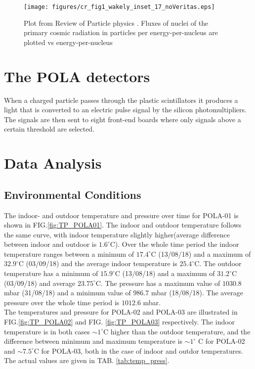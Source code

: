\documentclass[prX, twocolumn, a4paper]{revtex4}
\begin{document}
\begin{figure}
    \centering
    \texttt{[image: figures/cr\_fig1\_wakely\_inset\_17\_noVeritas.eps]}
    \caption{Plot from Review of Particle physics \cite{PhysRevD.98.030001}. Fluxes of nuclei of the primary cosmic radiation in particles per energy-per-nucleus are plotted vs energy-per-nucleus}
    \label{fig:cosmic_ray_flux}
\end{figure}

\section{The POLA detectors}

When a charged particle passes through the plastic scintillators it produces a light that is converted to an electric pulse signal by the silicon photomultipliers. The signals are then sent to eight front-end boards where only signals above a certain threshold are selected.

\section{Data Analysis}
\subsection{Environmental Conditions}

The indoor- and outdoor temperature and pressure over time for POLA-01 is shown in FIG.\ref{fig:TP_POLA01}. The indoor and outdoor temperature follows the same curve, with indoor temperature slightly higher(average difference between indoor and outdoor is $1.6^\circ$C). Over the whole time period the indoor temperature ranges between a minimum of $17.4^\circ$C (13/08/18) and a maximum of $32.9^\circ$C (03/09/18) and the average indoor temperature is $25.4^\circ$C. The outdoor temperature has a minimum of $15.9^\circ$C (13/08/18) and a maximum of $31.2^\circ$C (03/09/18) and average $23.75^\circ$C. The pressure has a maximum value of $1030.8$ mbar (31/08/18) and a minimum value of $986.7$ mbar (18/08/18). The average pressure over the whole time period is $1012.6$ mbar.\\

The temperatures and pressure for POLA-02 and POLA-03 are illustrated in  FIG.\ref{fig:TP_POLA02} and FIG. \ref{fig:TP_POLA03} respectively. The indoor temperature is in both cases $\sim 1^\circ$C higher than the outdoor temperature, and the difference between minimum and maximum temperature is $\sim 1^\circ$ C for POLA-02 and $\sim 7.5^\circ$C for POLA-03, both in the case of indoor and outdor temperatures. The actual values are given in TAB. \ref{tab:temp_press}. \\
\end{document}
